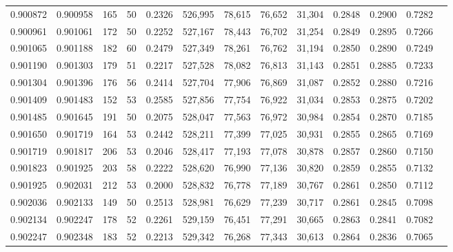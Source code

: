 \begin{tabular}{rrrrrrrrrrrrr}
0.900872 & 0.900958 &   165 &  50 &                                     0.2326 & 526,995 &  78,615 &  76,652 &  31,304 & 0.2848 & 0.2900 & 0.7282 \\
0.900961 & 0.901061 &   172 &  50 &                                     0.2252 & 527,167 &  78,443 &  76,702 &  31,254 & 0.2849 & 0.2895 & 0.7266 \\
0.901065 & 0.901188 &   182 &  60 &                                     0.2479 & 527,349 &  78,261 &  76,762 &  31,194 & 0.2850 & 0.2890 & 0.7249 \\
0.901190 & 0.901303 &   179 &  51 &                                     0.2217 & 527,528 &  78,082 &  76,813 &  31,143 & 0.2851 & 0.2885 & 0.7233 \\
0.901304 & 0.901396 &   176 &  56 &                                     0.2414 & 527,704 &  77,906 &  76,869 &  31,087 & 0.2852 & 0.2880 & 0.7216 \\
0.901409 & 0.901483 &   152 &  53 &                                     0.2585 & 527,856 &  77,754 &  76,922 &  31,034 & 0.2853 & 0.2875 & 0.7202 \\
0.901485 & 0.901645 &   191 &  50 &                                     0.2075 & 528,047 &  77,563 &  76,972 &  30,984 & 0.2854 & 0.2870 & 0.7185 \\
0.901650 & 0.901719 &   164 &  53 &                                     0.2442 & 528,211 &  77,399 &  77,025 &  30,931 & 0.2855 & 0.2865 & 0.7169 \\
0.901719 & 0.901817 &   206 &  53 &                                     0.2046 & 528,417 &  77,193 &  77,078 &  30,878 & 0.2857 & 0.2860 & 0.7150 \\
0.901823 & 0.901925 &   203 &  58 &                                     0.2222 & 528,620 &  76,990 &  77,136 &  30,820 & 0.2859 & 0.2855 & 0.7132 \\
0.901925 & 0.902031 &   212 &  53 &                                     0.2000 & 528,832 &  76,778 &  77,189 &  30,767 & 0.2861 & 0.2850 & 0.7112 \\
0.902036 & 0.902133 &   149 &  50 &                                     0.2513 & 528,981 &  76,629 &  77,239 &  30,717 & 0.2861 & 0.2845 & 0.7098 \\
0.902134 & 0.902247 &   178 &  52 &                                     0.2261 & 529,159 &  76,451 &  77,291 &  30,665 & 0.2863 & 0.2841 & 0.7082 \\
0.902247 & 0.902348 &   183 &  52 &                                     0.2213 & 529,342 &  76,268 &  77,343 &  30,613 & 0.2864 & 0.2836 & 0.7065 \\

\end{tabular}
